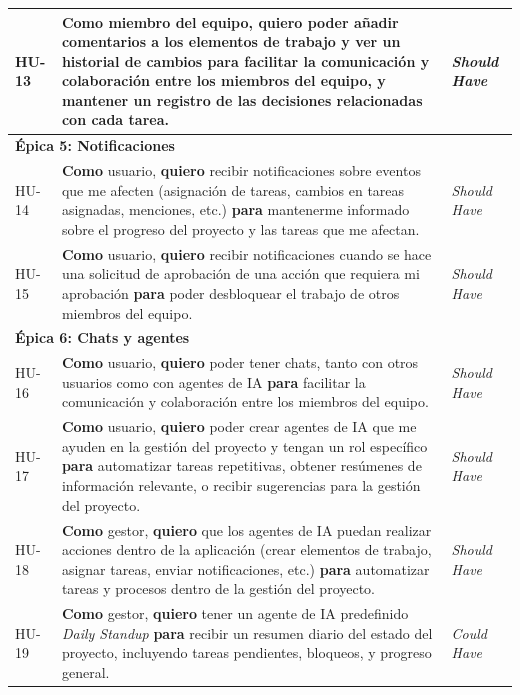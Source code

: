 \begin{longtable}{|p{1.5cm}|p{9cm}|p{3cm}|}
HU-13 &
\textbf{Como} miembro del equipo, \textbf{quiero} poder añadir comentarios a los elementos de trabajo y ver un historial de cambios
\textbf{para} facilitar la comunicación y colaboración entre los miembros del equipo, y mantener un registro de las decisiones relacionadas con cada tarea.
& \emph{Should Have} \\
\hline

\multicolumn{3}{|l|}{\cellcolor{gray!15}\textbf{Épica 5: Notificaciones}} \\
\hline

HU-14 &
\textbf{Como} usuario, \textbf{quiero} recibir notificaciones sobre eventos que me afecten (asignación de tareas, cambios en tareas asignadas, menciones, etc.)
\textbf{para} mantenerme informado sobre el progreso del proyecto y las tareas que me afectan.
& \emph{Should Have} \\
\hline

HU-15 &
\textbf{Como} usuario, \textbf{quiero} recibir notificaciones cuando se hace una solicitud de aprobación de una acción que requiera mi aprobación
\textbf{para} poder desbloquear el trabajo de otros miembros del equipo.
& \emph{Should Have} \\
\hline

\multicolumn{3}{|l|}{\cellcolor{gray!15}\textbf{Épica 6: Chats y agentes}} \\
\hline

HU-16 &
\textbf{Como} usuario, \textbf{quiero} poder tener chats, tanto con otros usuarios como con agentes de \ac{IA}
\textbf{para} facilitar la comunicación y colaboración entre los miembros del equipo.
& \emph{Should Have} \\
\hline

HU-17 &
\textbf{Como} usuario, \textbf{quiero} poder crear agentes de \ac{IA} que me ayuden en la gestión del proyecto y tengan un rol específico
\textbf{para} automatizar tareas repetitivas, obtener resúmenes de información relevante, o recibir sugerencias para la gestión del proyecto.
& \emph{Should Have} \\
\hline

HU-18 &
\textbf{Como} gestor, \textbf{quiero} que los agentes de \ac{IA} puedan realizar acciones dentro de la aplicación (crear elementos de trabajo, asignar tareas, enviar notificaciones, etc.)
\textbf{para} automatizar tareas y procesos dentro de la gestión del proyecto.
& \emph{Should Have} \\
\hline

HU-19 &
\textbf{Como} gestor, \textbf{quiero} tener un agente de \ac{IA} predefinido \emph{Daily Standup} \textbf{para} recibir un resumen diario del estado del proyecto, incluyendo tareas pendientes, bloqueos, y progreso general.
& \emph{Could Have} \\
\hline


\end{longtable}
